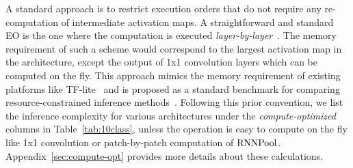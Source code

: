 \documentclass[10pt]{article}
\newcommand{\rpool}{\ensuremath{{\rm RNNPool}}\xspace}
\begin{document}
A standard approach is to restrict execution orders that do not
require any re-computation of intermediate activation maps. A
straightforward and standard EO is the one where the computation is
executed {\em
  layer-by-layer}~\citep{chowdhery2019visual,sandler2018mobilenetv2}.
The memory requirement of such a scheme would correspond to the
largest activation map in the architecture, except the
output of 1x1 convolution layers which can be computed on the
fly. This approach mimics the memory requirement of existing platforms
like TF-lite~\citep{tf-lite} and is proposed as a standard benchmark
for comparing resource-constrained inference
methods~\citep{chowdhery2019visual}.  Following this prior convention,
we list the inference complexity for various architectures under the
{\em compute-optimized} columns in Table~\ref{tab:10class}, unless the
operation is easy to compute on the fly like 1x1 convolution or
patch-by-patch computation of \rpool.  Appendix~\ref{sec:compute-opt}
provides more details about these calculations.
\end{document}
